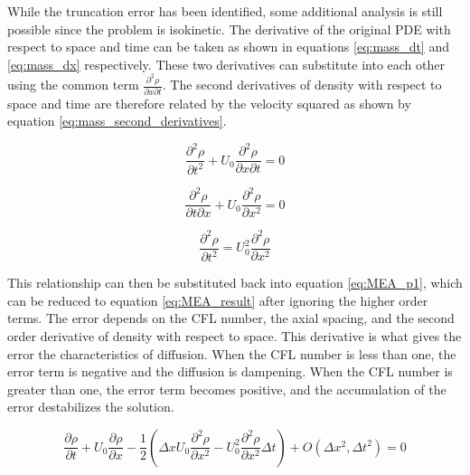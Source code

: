     While the truncation error has been identified, some additional analysis is
    still possible since the problem is isokinetic. The  derivative of the
    original PDE with respect to space and time can be taken as shown in
    equations \ref{eq:mass_dt} and  \ref{eq:mass_dx} respectively. These two
    derivatives can substitute into each other using the common term
    $\frac{\partial^2 \rho}{\partial x \partial t}$. The second derivatives of
    density with respect to space and time are therefore related by the
    velocity squared as shown by equation \ref{eq:mass_second_derivatives}.
    
    \begin{equation}
    \label{eq:mass_dt}
    	 \frac{\partial^2 \rho}{\partial t^2} + U_{0} \frac{\partial^2 \rho}{\partial x \partial t} = 0
    \end{equation}
    
    \begin{equation}
    \label{eq:mass_dx}
    	 \frac{\partial^2 \rho}{\partial t \partial x} + U_{0} \frac{\partial^2 \rho}{\partial x^2} = 0
    \end{equation}
    
    \begin{equation}
    \label{eq:mass_second_derivatives}
    	 \frac{\partial^2 \rho}{\partial t^2} =  U_{0}^2 \frac{\partial^2 \rho}{\partial x^2}
    \end{equation} \linebreak
    
    This relationship can then be substituted back into equation \ref{eq:MEA_p1}, 
    which can be reduced to equation \ref{eq:MEA_result} after ignoring the higher
    order terms. The error depends on the CFL number, the axial spacing, and the
    second order derivative of density with respect to space. This derivative is
    what gives the error the characteristics of diffusion. When the CFL number
    is less than one, the error term is negative and the diffusion is dampening. When
    the CFL number is greater than one, the error term becomes positive, and the
    accumulation of the error destabilizes the solution. 
    
    \begin{equation}
    	 \frac{\partial \rho}{\partial t}  +  U_{0} \frac{\partial \rho}{\partial x} - 
    	  \frac{1}{2}  \left(  \Delta x U_{0} \frac{\partial^2 \rho}{\partial
    	  x^2} -   U_{0}^2 \frac{\partial^2 \rho}{\partial x^2} \Delta t  \right) 
    	   + O(\Delta x^{2},\Delta t^{2}) = 0
    \end{equation}
    
